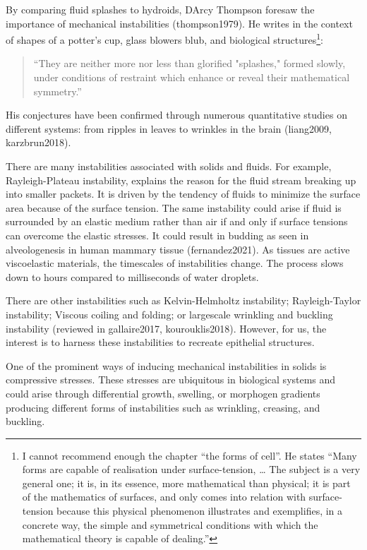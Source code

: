 \documentclass[
]{article}
\begin{document}
By comparing fluid splashes to hydroids, D\textquotesingle Arcy Thompson
foresaw the importance of mechanical instabilities (thompson1979). He
writes in the context of shapes of a potter's cup, glass blowers blub,
and biological structures\footnote{I cannot recommend enough the chapter
  ``the forms of cell''. He states ``Many forms are capable of
  realisation under surface-tension, \ldots{} The subject is a very
  general one; it is, in its essence, more mathematical than physical;
  it is part of the mathematics of surfaces, and only comes into
  relation with surface-tension because this physical phenomenon
  illustrates and exemplifies, in a concrete way, the simple and
  symmetrical conditions with which the mathematical theory is capable
  of dealing.''}:

\begin{quote}
``They are neither more nor less than glorified "splashes," formed
slowly, under conditions of restraint which enhance or reveal their
mathematical symmetry.''
\end{quote}

His conjectures have been confirmed through numerous quantitative
studies on different systems: from ripples in leaves to wrinkles in the
brain (liang2009, karzbrun2018).

There are many instabilities associated with solids and fluids. For
example, Rayleigh-Plateau instability, explains the reason for the fluid
stream breaking up into smaller packets. It is driven by the tendency of
fluids to minimize the surface area because of the surface tension. The
same instability could arise if fluid is surrounded by an elastic medium
rather than air if and only if surface tensions can overcome the elastic
stresses. It could result in budding as seen in alveologenesis in human
mammary tissue (fernandez2021). As tissues are active viscoelastic
materials, the timescales of instabilities change. The process slows
down to hours compared to milliseconds of water droplets.

There are other instabilities such as Kelvin-Helmholtz instability;
Rayleigh-Taylor instability; Viscous coiling and folding; or largescale
wrinkling and buckling instability (reviewed in gallaire2017,
kourouklis2018). However, for us, the interest is to harness these
instabilities to recreate epithelial structures.

One of the prominent ways of inducing mechanical instabilities in solids
is compressive stresses. These stresses are ubiquitous in biological
systems and could arise through differential growth, swelling, or
morphogen gradients producing different forms of instabilities such as
wrinkling, creasing, and buckling.
\end{document}
